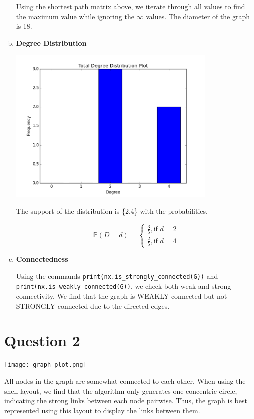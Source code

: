 \documentclass[a4paper]{article}
\begin{document}
\begin{enumerate}[(a)]
Using the shortest path matrix above, we iterate through all values to find the maximum value while ignoring the $\infty$ values. The diameter of the graph is 18.

\item \textbf{Degree Distribution}

\begin{center}
\includegraphics[width=100mm]{degree_histogram.png}
\end{center}

The support of the distribution is \{2,4\} with the probabilities,

$$\mathbb{P}(D=d)=
\begin{cases}
\frac{3}{5}, \text{if }d=2\\
\frac{2}{5}, \text{if }d=4
\end{cases}
$$

\item \textbf{Connectedness}

Using the commands \texttt{print(nx.is\_strongly\_connected(G))} and \texttt{print(nx.is\_weakly\_connected(G))}, we check both weak and strong connectivity. We find that the graph is WEAKLY connected but not STRONGLY connected due to the directed edges.

\end{enumerate}

\section*{Question 2}

\begin{center}
\texttt{[image: graph\_plot.png]}
\end{center}

All nodes in the graph are somewhat connected to each other. When using the shell layout, we find that the algorithm only generates one concentric circle, indicating the strong links between each node pairwise. Thus, the graph is best represented using this layout to display the  links between them.
\end{document}
